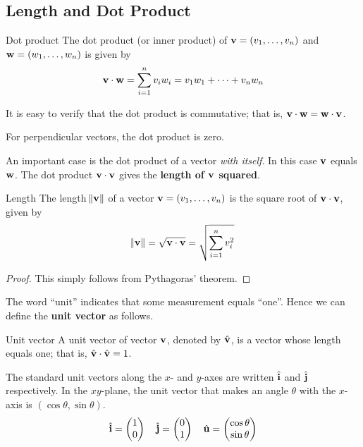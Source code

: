 \subsection{Length and Dot Product}
\begin{defn}{Dot product}{}
The dot product (or inner product) of $\vb{v}=(v_1,\dots,v_n)$ and $\vb{w}=(w_1,\dots,w_n)$ is given by
\begin{equation}
\vb{v} \cdot \vb{w} = \sum_{i=1}^nv_iw_i = v_1w_1 + \cdots + v_nw_n
\end{equation}
\end{defn}

It is easy to verify that the dot product is commutative; that is, $\vb{v} \cdot \vb{w} = \vb{w} \cdot \vb{v}$.

For perpendicular vectors, the dot product is zero.

An important case is the dot product of a vector \emph{with itself}. In this case $\vb{v}$ equals $\vb{w}$. The dot product $\vb{v} \cdot \vb{v}$ gives the \textbf{length of $\vb{v}$ squared}.

\begin{defn}{Length}{}
The length $\norm{\vb{v}}$ of a vector $\vb{v}=(v_1,\dots,v_n)$ is the square root of $\vb{v}\cdot\vb{v}$, given by
\begin{equation}
\norm{\vb{v}} = \sqrt{\vb{v}\cdot\vb{v}} = \sqrt{\sum_{i=1}^nv_i^2}
\end{equation}
\end{defn}

\begin{proof}
This simply follows from Pythagoras' theorem.
\end{proof}

The word ``unit” indicates that some measurement equals ``one”. Hence we can define the \textbf{unit vector} as follows.

\begin{defn}{Unit vector}{}
A unit vector of vector $\vb{v}$, denoted by $\hat{\vb{v}}$, is a vector whose length equals one; that is, $\hat{\vb{v}}\cdot\hat{\vb{v}}=1$.
\end{defn}

The standard unit vectors along the $x$- and $y$-axes are written $\hat{\vb{i}}$ and $\hat{\vb{j}}$ respectively. In the $xy$-plane, the unit vector that makes an angle $\theta$ with the $x$-axis is $(\cos\theta,\sin\theta)$.
\[ \hat{\vb{i}}=\begin{pmatrix} 1 \\ 0 \end{pmatrix} \quad \hat{\vb{j}}=\begin{pmatrix} 0 \\ 1 \end{pmatrix} \quad \hat{\vb{u}}=\begin{pmatrix} \cos\theta \\ \sin\theta \end{pmatrix} \]

